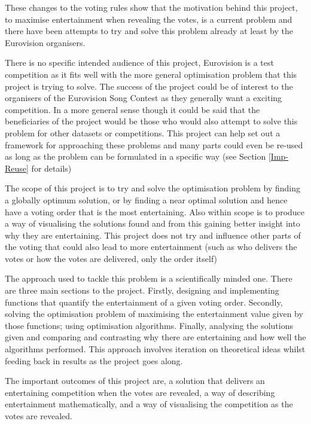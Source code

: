 \documentclass[12pt]{report}
\begin{document}
These changes to the voting rules show that the motivation behind this project, to maximise entertainment when revealing the votes, is a current problem and there have been attempts to try and solve this problem already at least by the Eurovision organisers.

There is no specific intended audience of this project, Eurovision is a test competition as it fits well with the more general optimisation problem that this project is trying to solve. The success of the project could be of interest to the organisers of the Eurovision Song Contest as they generally want a exciting competition. In a more general sense though it could be said that the beneficiaries of the project would be those who would also attempt to solve this problem for other datasets or competitions. This project can help set out a framework for approaching these problems and many parts could even be re-used as long as the problem can be formulated in a specific way (see Section \ref{Imp-Reuse} for details)

The scope of this project is to try and solve the optimisation problem by finding a globally optimum solution, or by finding a near optimal solution and hence have a voting order that is the most entertaining. Also within scope is to produce a way of visualising the solutions found and from this gaining better insight into why they are entertaining. This project does not try and influence other parts of the voting that could also lead to more entertainment (such as who delivers the votes or  how the votes are delivered, only the order itself)

The approach used to tackle this problem is a scientifically minded one. There are three main sections to the project. Firstly, designing and implementing functions that quantify the entertainment of a given voting order. Secondly, solving the optimisation problem of maximising the entertainment value given by those functions; using optimisation algorithms. Finally, analysing the solutions given and comparing and contrasting why there are entertaining and how well the algorithms performed. This approach involves iteration on theoretical ideas whilst feeding back in results as the project goes along.

The important outcomes of this project are, a solution that delivers an entertaining competition when the votes are revealed, a way of describing entertainment mathematically, and a way of visualising the competition as the votes are revealed.
\end{document}
